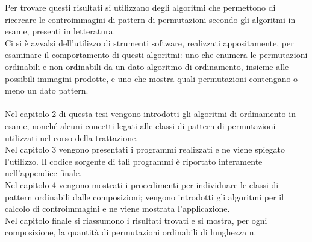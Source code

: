 Per trovare questi risultati si utilizzano degli algoritmi che permettono di ricercare le controimmagini di pattern di permutazioni secondo gli algoritmi in esame, presenti in letteratura.\\
Ci si \`e avvalsi dell'utilizzo di strumenti software, realizzati appositamente, per esaminare il comportamento di questi algoritmi: uno che enumera le permutazioni ordinabili e non ordinabili da un dato algoritmo di ordinamento, insieme alle possibili immagini prodotte, e uno che mostra quali permutazioni contengano o meno un dato pattern.\\\\
Nel capitolo 2 di questa tesi vengono introdotti gli algoritmi di ordinamento in esame, nonch\'e alcuni concetti legati alle classi di pattern di permutazioni utilizzati nel corso della trattazione.\\
Nel capitolo 3 vengono presentati i programmi realizzati e ne viene spiegato l'utilizzo. Il codice sorgente di tali programmi \`e riportato interamente nell'appendice finale.\\
Nel capitolo 4 vengono mostrati i procedimenti per individuare le classi di pattern ordinabili dalle composizioni; vengono introdotti gli algoritmi per il calcolo di controimmagini e ne viene mostrata l'applicazione.\\
Nel capitolo finale si riassumono i risultati trovati e si mostra, per ogni composizione, la quantit\`a di permutazioni ordinabili di lunghezza n.
